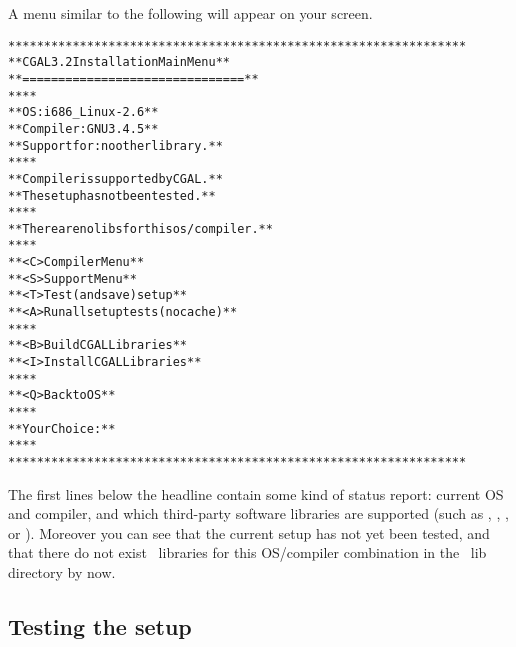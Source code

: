 A menu similar to the following will appear on your screen.

{\ccTexHtml{\scriptsize}{} \label{pic:main-menu}
\begin{alltt}
  ****************************************************************
  **             CGAL 3.2 Installation Main Menu                **
  **             ===============================                **
  **                                                            **
  **   OS:          i686_Linux-2.6                              **
  **   Compiler:    GNU 3.4.5                                   **
  **   Support for: no other library.                           **
  **                                                            **
  **   Compiler is supported by CGAL.                           **
  **   The setup has not been tested.                           **
  **                                                            **
  **   There are no libs for this os/compiler.                  **
  **                                                            **
  **   <C>  Compiler Menu                                       **
  **   <S>  Support Menu                                        **
  **   <T>  Test (and save) setup                               **
  **   <A>  Run all setup tests (no cache)                      **
  **                                                            **
  **   <B>  Build CGAL Libraries                                **
  **   <I>  Install CGAL Libraries                              **
  **                                                            **
  **   <Q>  Back to OS                                          **
  **                                                            **
  **   Your Choice:                                             **
  **                                                            **
  ****************************************************************
\end{alltt}}

The first lines below the headline contain some kind of status report:
current OS and compiler, and which third-party software libraries are
supported (such as \gmp, \core, \leda, or \qt). Moreover you can see
that the current setup has not yet been tested, and that there do not
exist \cgal\ libraries for this OS/compiler combination in the \cgal\ 
lib directory by now.

\subsection{Testing the setup}\label{sec:test-the-setup}


